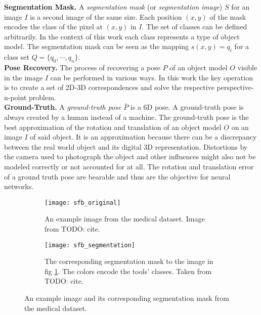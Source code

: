 \noindent\textbf{Segmentation Mask.} A \textit{segmentation mask} (or \textit{segmentation image}) $S$ for an image $I$ is a second image of the same size. Each position $(x, y)$ of the mask encodes the class of the pixel at $(x, y)$ in $I$. The set of classes can be defined arbitrarily. In the context of this work each class represents a type of object model. The segmentation mask can be seen as the mapping $s(x, y) = q_i$ for a class set $Q = \{q_0, \cdots, q_n\}$. \\

\noindent\textbf{Pose Recovery.} The process of recovering a pose $P$ of an object model $O$ visible in the image $I$ can be performed in various ways. In this work the key operation is to create a set of 2D-3D correspondences and solve the respective perspective-n-point problem. \\

\noindent\textbf{Ground-Truth.} A \textit{ground-truth pose} $\bar{P}$ is a 6D pose. A ground-truth pose is always created by a human instead of a machine. The ground-truth pose is the best approximation of the rotation and translation of an object model $O$ on an image $I$ of said object. It is an approximation because there can be a discrepancy between the real world object and its digital 3D representation. Distortions by the camera used to photograph the object and other influences might also not be modeled correctly or not accounted for at all. The rotation and translation error of a ground truth pose are bearable and thus are the objective for neural networks.

\begin{figure}[!tbp]
	\centering
	\begin{subfigure}[t]{0.47\textwidth}
	\centering
    	\texttt{[image: sfb\_original]}
    	\caption{An example image from the medical dataset. Image from TODO: cite.}
    	\label{fig:sfb_original}
	\end{subfigure}
	\hfill
	\begin{subfigure}[t]{0.47\textwidth}
	\centering
    	\texttt{[image: sfb\_segmentation]}
    	\caption{The corresponding segmentation mask to the image in fig \ref{fig:sfb_original}. The colors encode the tools' classes. Taken from TODO: cite.}
    	\label{fig:sfb_segmentation}
	\end{subfigure}
	\caption{An example image and its corresponding segmentation mask from the medical dataset.}
	\label{fig:sfb}
\end{figure} 

